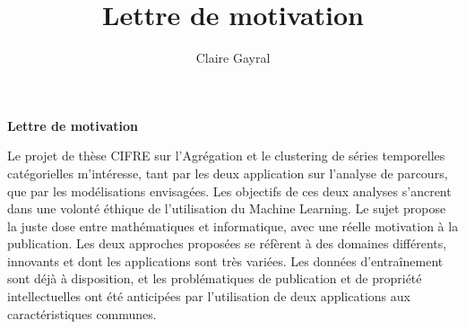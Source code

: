 \documentclass[a4paper,11pt]{article}
\title{Lettre de motivation}
\author{Claire Gayral}
\date{}
\begin{document}
{\centering \Large \bf Lettre de motivation \\ \vspace{0.6cm} }

Le projet de thèse CIFRE sur l'Agrégation et le clustering de séries temporelles catégorielles m'intéresse, tant par les deux application sur l'analyse de parcours, que par les modélisations envisagées. Les objectifs de ces deux analyses s'ancrent dans une volonté éthique de l'utilisation du Machine Learning. Le sujet propose la juste dose entre mathématiques et informatique, avec une réelle motivation à la publication. Les deux approches proposées se réfèrent à des domaines différents, innovants et dont les applications sont très variées.%
Les données d'entraînement sont déjà à disposition, et les problématiques de publication et de propriété intellectuelles ont été anticipées par l'utilisation de deux applications aux caractéristiques communes. \\
\end{document}
